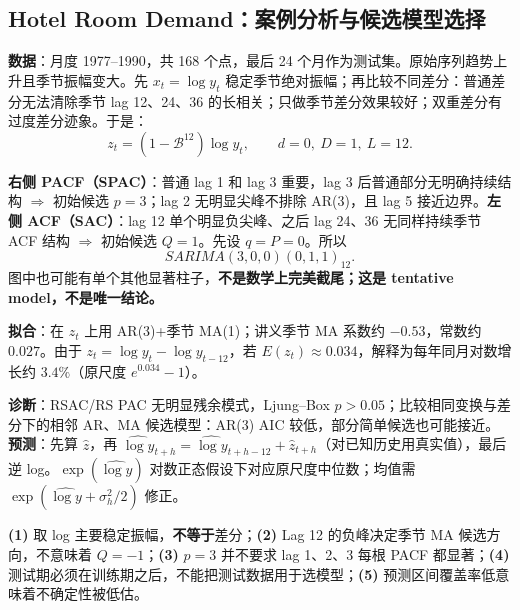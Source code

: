 \documentclass[UTF8,fontset=fandol,10.5pt,a4paper]{ctexart}
\newcommand{\formula}[1]{\[\boxed{#1}\]}
\begin{document}
\subsection{Hotel Room Demand：案例分析与候选模型选择}
\textbf{数据}：月度 1977--1990，共 168 个点，最后 24 个月作为测试集。原始序列趋势上升且季节振幅变大。先 $x_t=\log y_t$ 稳定季节绝对振幅；再比较不同差分：普通差分无法清除季节 lag 12、24、36 的长相关；只做季节差分效果较好；双重差分有过度差分迹象。于是：
\formula{z_t=(1-\mathcal B^{12})\log y_t,\qquad d=0,\ D=1,\ L=12.}
\par\smallskip{}\par\smallskip
\par\smallskip{}\par\smallskip
\par\smallskip{}\par\smallskip
\begin{keybox}[title={从图到模型：考试最重要的一步}]
\textbf{右侧 PACF（SPAC）}：普通 lag 1 和 lag 3 重要，lag 3 后普通部分无明确持续结构 $\Rightarrow$ 初始候选 $p=3$；lag 2 无明显尖峰不排除 AR(3)，且 lag 5 接近边界。\textbf{左侧 ACF（SAC）}：lag 12 单个明显负尖峰、之后 lag 24、36 无同样持续季节 ACF 结构 $\Rightarrow$ 初始候选 $Q=1$。先设 $q=P=0$。所以
\formula{SARIMA(3,0,0)(0,1,1)_{12}.}
图中也可能有单个其他显著柱子，\textbf{不是数学上完美截尾；这是 tentative model，不是唯一结论。}
\end{keybox}
\textbf{拟合}：在 $z_t$ 上用 AR(3)+季节 MA(1)；讲义季节 MA 系数约 $-0.53$，常数约 $0.027$。由于 $z_t=\log y_t-\log y_{t-12}$，若 $E(z_t)\approx0.034$，解释为每年同月对数增长约 $3.4\%$（原尺度 $e^{0.034}-1$）。
\par\smallskip{}\par\smallskip
\textbf{诊断}：RSAC/RS PAC 无明显残余模式，Ljung--Box $p>0.05$；比较相同变换与差分下的相邻 AR、MA 候选模型：AR(3) AIC 较低，部分简单候选也可能接近。\textbf{预测}：先算 $\hat z$，再 $\widehat{\log y}_{t+h}=\widehat{\log y}_{t+h-12}+\hat z_{t+h}$（对已知历史用真实值），最后逆 log。$\exp(\widehat{\log y})$ 对数正态假设下对应原尺度中位数；均值需 $\exp(\widehat{\log y}+\sigma_h^2/2)$ 修正。
\par\smallskip{}\par\smallskip
\begin{pitbox}
\textbf{(1)} 取 log 主要稳定振幅，\textbf{不等于}差分；\textbf{(2)} Lag 12 的负峰决定季节 MA 候选方向，不意味着 $Q=-1$；\textbf{(3)} $p=3$ 并不要求 lag 1、2、3 每根 PACF 都显著；\textbf{(4)} 测试期必须在训练期之后，不能把测试数据用于选模型；\textbf{(5)} 预测区间覆盖率低意味着不确定性被低估。
\end{pitbox}
\end{document}
